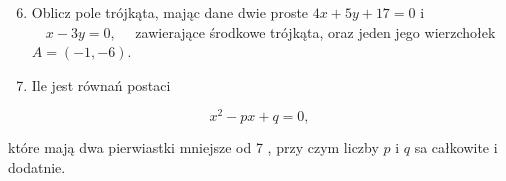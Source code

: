 \documentclass[10pt]{article}
\begin{document}
\begin{enumerate}
  \setcounter{enumi}{5}
  \item Oblicz pole trójkąta, mając dane dwie proste $4 x+5 y+17=0$ i $\quad x-3 y=0, \quad$ zawierające środkowe trójkąta, oraz jeden jego wierzchołek $A=(-1,-6)$.
  \item Ile jest równań postaci
\end{enumerate}

$$
x^{2}-p x+q=0,
$$

które mają dwa pierwiastki mniejsze od 7 , przy czym liczby $p$ i $q$ sa całkowite i dodatnie.
\end{document}
